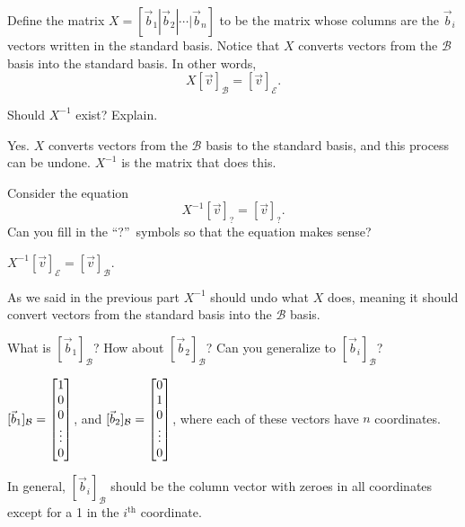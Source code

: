	Define the matrix $X=[\vec b_1|\vec b_2|\cdots|\vec b_n]$ to be the matrix whose columns are the $\vec b_i$ vectors
	written in the standard basis. Notice that $X$ converts
	vectors from the $\mathcal B$ basis into the standard basis. In other words,
	\[
		X[\vec v]_{\mathcal B} = [\vec v]_{\mathcal E}.
	\]
	\begin{parts}
		\item Should $X^{-1}$ exist? Explain.
			\begin{solution}
				Yes. $X$ converts vectors from the
				$\mathcal B$ basis to the standard basis, and this process can be undone.
				$X^{-1}$ is the matrix that does this.
			\end{solution}
		\item Consider the equation
			\[
				X^{-1}[\vec v]_{?} = [\vec v]_{?}.
			\]
			Can you fill in the ``?''~symbols so that the equation makes sense?
			\begin{solution}
				$X^{-1}[\vec v]_{\mathcal E} = [\vec v]_{\mathcal B}$.

				As we said in the previous part $X^{-1}$ should undo what $X$ does,
				meaning it should convert vectors from the standard basis into
				the $\mathcal B$ basis.
			\end{solution}
		\item What is $[\vec b_1]_{\mathcal B}$?  How about $[\vec b_2]_{\mathcal B}$?  Can
			you generalize to $[\vec b_i]_{\mathcal B}$?
			\begin{solution}
				$[\vec b_1]_{\mathcal B}=\begin{bmatrix}1\\0\\0\\\vdots\\0\end{bmatrix}$, and
				$[\vec b_2]_{\mathcal B}=\begin{bmatrix}0\\1\\0\\\vdots\\0\end{bmatrix}$, where each of
				these vectors have $n$ coordinates.

				In general, $[\vec b_i]_{\mathcal B}$ should be the column vector
				with zeroes in all coordinates except for a 1 in the $i^\text{th}$
				coordinate.
			\end{solution}
	\end{parts}

